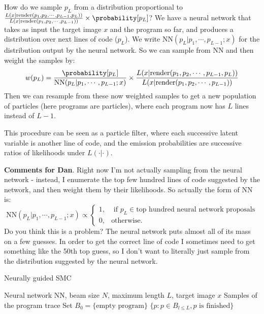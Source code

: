 \documentclass{article}
\begin{document}
How do we sample $p_L$ from a distribution proportional to $\frac{L(x
  | \text{render}(p_1,p_2,\cdots,p_{L - 1},p_L))}{L(x |
  \text{render}(p_1,p_2,\cdots,p_{L - 1}))}\times\probability [p_L]$?
We have a neural network that takes as input the target image $x$ and
the program so far, and produces a distribution over next lines of
code ($p_L$).  We write $\text{NN}(p_L | p_1,\cdots,p_{L - 1};x)$ for
the distribution output by the neural network. So we can sample from NN and then weight the samples by:
\begin{equation}
  w(p_L) = \frac{\probability [p_L]}{\text{NN}(p_L | p_1,\cdots,p_{L - 1};x)}\times \frac{L(x | \text{render}(p_1,p_2,\cdots,p_{L - 1},p_L))}{L(x | \text{render}(p_1,p_2,\cdots,p_{L - 1}))}
\end{equation}
Then we can resample from these now weighted samples to get a new
population of particles (here programs are particles), where each
program now has $L$ lines instead of $L - 1$.

This procedure can be seen as a particle filter, where each successive
latent variable is another line of code, and the emission
probabilities are successive ratios of likelihoods under $L(\cdot |
\cdot)$.

\textbf{Comments for Dan}. Right now I'm not actually sampling from
the neural network - instead, I enumerate the top few hundred lines of
code suggested by the network, and then weight them by their
likelihoods.
So actually the form of NN is:
\begin{equation}
  \text{NN}(p_L | p_1,\cdots,p_{L - 1};x)\propto \begin{cases}
    1,&\text{ if }p_L \in \text{top hundred neural network proposals}\\
0,&\text{otherwise}.    \end{cases}
\end{equation}
Do you think this is a problem? The neural network puts almost all of its mass on a few guesses.
In order to get the correct line of code I sometimes need to get something like the 50th  top guess,
so I don't want to literally just sample from the distribution suggested by the neural network.


  \begin{algorithm}[tb]
   \caption{Neurally guided SMC}
   \label{guideAlgorithm}
\begin{algorithmic}
   Neural network NN, beam size $N$, maximum length $L$, target image $x$
   Samples of the program trace
  \STATE Set $B_0 = \{\text{empty program}\}$
  \ENDFOR
  \ENDFOR
   $\{p : p\in B_{l\leq L}, p \text{ is finished}\}$
\end{algorithmic}
  \end{algorithm}
\end{document}
